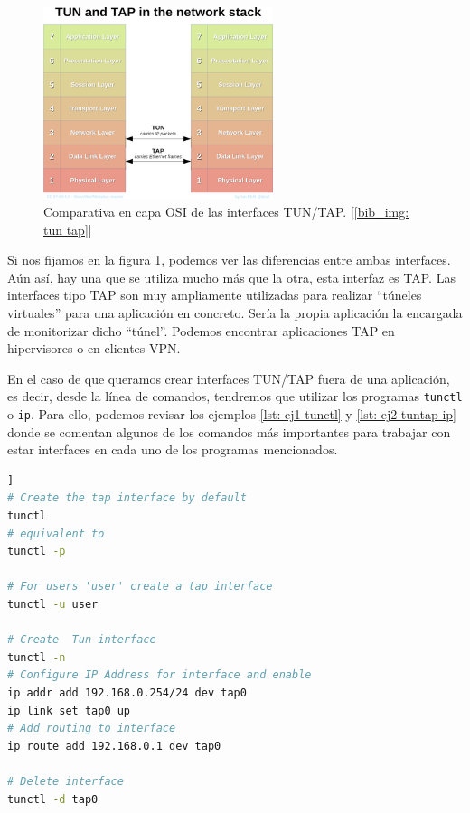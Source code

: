 \documentclass[12pt]{article}
\begin{document}
	\begin{figure}[h!]
		\begin{center}
			\includegraphics[width=0.6\textwidth]{img/tun_vs_tap.png}
			\caption{Comparativa en capa OSI de las interfaces TUN/TAP. [\ref{bib_img: tun tap}]}
			\label{img: tun vs tap}
		\end{center}
	\end{figure}
	
	\noindent Si nos fijamos en la figura \ref{img: tun vs tap}, podemos ver las diferencias entre ambas interfaces. Aún así, hay una que se utiliza mucho más que la otra, esta interfaz es TAP. Las interfaces tipo TAP son muy ampliamente utilizadas para realizar ``túneles virtuales'' para una aplicación en concreto. Sería la propia aplicación la encargada de monitorizar dicho ``túnel''. Podemos encontrar aplicaciones TAP en hipervisores o en clientes VPN.
	
	\pagebreak
	
	\noindent En el caso de que queramos crear interfaces TUN/TAP fuera de una aplicación, es decir, desde la línea de comandos, tendremos que utilizar los programas \texttt{tunctl} o \texttt{ip}. Para ello, podemos revisar los ejemplos \ref{lst: ej1 tunctl} y \ref{lst: ej2 tuntap ip} donde se comentan algunos de los comandos más importantes para trabajar con estar interfaces en cada uno de los programas mencionados.
	
	\vspace{10px}
	
	\begin{lstlisting}[language=Bash, label=lst: ej1 tunctl, caption=Ejemplo de uso de \texttt{tunctl} para controlar interfaces TUN/TAP [\ref{bib: tunctl + ip}]]
# Create the tap interface by default
tunctl 
# equivalent to
tunctl -p

# For users 'user' create a tap interface
tunctl -u user

# Create  Tun interface
tunctl -n
# Configure IP Address for interface and enable
ip addr add 192.168.0.254/24 dev tap0
ip link set tap0 up
# Add routing to interface
ip route add 192.168.0.1 dev tap0

# Delete interface
tunctl -d tap0
	\end{lstlisting}
\end{document}
